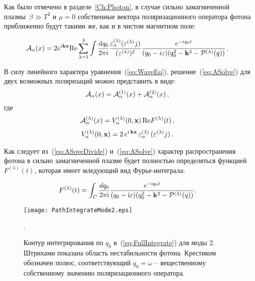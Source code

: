 Как было отмечено в разделе~\ref{Ch:Photon}, в случае сильно замагниченной плазмы~$\beta\gg T^2$ и $\mu=0$ собственные вектора поляризационного оператора фотона приближенно будут такими же, как и в чистом магнитном поле:

\begin{equation}\label{eq:ASolve}
	{\cal A}_\alpha(x) = 2 e^{i \mathbf{kx}} \mathrm{Re} \sum_{\lambda=1}^3 \int\frac{\mathrm{d} q_0}{2\pi i}\frac{\varepsilon_\alpha^{(\lambda)}(\varepsilon^{(\lambda)} j)}{(\varepsilon^{(\lambda)})^2}\frac{e^{-i q_0 t}}{(q_0-i\varepsilon)(q_0^2-\mathbf{k}^2-{\cal P}^{(\lambda)}(q))}\, .
\end{equation}

В силу линейного характера уравнения~(\ref{eq:WaveEq}), решение~(\ref{eq:ASolve}) для двух возможных поляризаций можно представить в виде:
\begin{equation}\label{eq:ASoveDivide}
	{\cal A}_\alpha(x)={\cal A}^{(1)}_\alpha(x)+{\cal A}^{(2)}_\alpha(x)\, ,
\end{equation}
где 
%
\begin{eqnarray}                        		
{\cal A}^{(\lambda)}_{\alpha} (x) = V^{(\lambda)}_\alpha (0, {\bf x}) \, \text{Re} F^{(\lambda)} (t) \, ,
\label{eq:V}
\end{eqnarray}
\begin{eqnarray}
V^{(\lambda)}_\alpha (0, {\bf x}) = 2\, e^{ i\, {\bf k x}} \, 
\varepsilon^{(\lambda)}_\alpha \, (\varepsilon^{(\lambda)} j)\, .
\label{eq:partialV}
\end{eqnarray}
%

Как следует из~(\ref{eq:ASoveDivide}) и~(\ref{eq:ASolve}) характер распространения фотона в сильно замагниченной плазме будет полностью определяться функцией $F^{(\lambda)} (t)$, которая имеет мледующий вид Фурье-интеграла:

\begin{equation}\label{eq:FullIntegrate}
	F^{(\lambda)}(t)=\int_C\frac{dq_0}{2\pi \mathrm{i}}\frac{e^{-\mathrm{i} q_0 t}}{(q_0-\mathrm{i} \varepsilon)(q_0^2-\mathbf{k}^2-{\cal P}^{(\lambda)}(q))}.
\end{equation}

	\begin{figure}[t]\centering
		\texttt{[image: PathIntegrateMode2.eps]}
		\caption{Контур интегрирования по $q_0$ в~(\ref{eq:FullIntegrate}) для моды 2. Штрихами показана область нестабильности фотона. Крестиком обозначен полюс, соответствующий $q_0=\omega$ -- вещественному собственному значению поляризационного оператора.}\label{fig:FullPathIntegr}.
	\end{figure}

